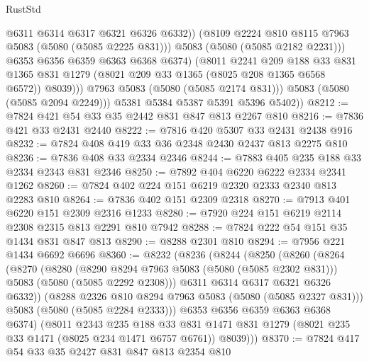 \begin{lexlean}{RustStd}
\begin{coremodule}
                        @6311
                        @6314
                        @6317
                        @6321
                        @6326
                        @6332))
                    (@8109 @2224 @810 @8115 @7963 @5083 (@5080 (@5085 @2225 @831)))
                    @5083
                    (@5080 (@5085 @2182 @2231)))
                  @6353
                  @6356
                  @6359
                  @6363
                  @6368
                  @6374)
                (@8011
                  @2241
                  @209
                  @188
                  @33
                  @831
                  @1365
                  @831
                  @1279
                  (@8021 @209 @33 @1365 (@8025 @208 @1365 @6568 @6572))
                  @8039)))
            @7963
            @5083
            (@5080 (@5085 @2174 @831)))
          @5083
          (@5080 (@5085 @2094 @2249)))
        @5381
        @5384
        @5387
        @5391
        @5396
        @5402))
@8212 := @7824 @421 @54 @33 @35 @2442 @831 @847 @813 @2267 @810
@8216 := @7836 @421 @33 @2431 @2440
@8222 := @7816 @420 @5307 @33 @2431 @2438 @916
@8232 := @7824 @408 @419 @33 @36 @2348 @2430 @2437 @813 @2275 @810
@8236 := @7836 @408 @33 @2334 @2346
@8244 := @7883 @405 @235 @188 @33 @2334 @2343 @831 @2346
@8250 := @7892 @404 @6220 @6222 @2334 @2341 @1262
@8260 := @7824 @402 @224 @151 @6219 @2320 @2333 @2340 @813 @2283 @810
@8264 := @7836 @402 @151 @2309 @2318
@8270 := @7913 @401 @6220 @151 @2309 @2316 @1233
@8280 := @7920 @224 @151 @6219 @2114 @2308 @2315 @813 @2291 @810 @7942
@8288 := @7824 @222 @54 @151 @35 @1434 @831 @847 @813
@8290 := @8288 @2301 @810
@8294 := @7956 @221 @1434 @6692 @6696
@8360 := @8232
    (@8236
      (@8244
        (@8250
          (@8260
            (@8264
              (@8270
                (@8280
                  (@8290 @8294 @7963 @5083 (@5080 (@5085 @2302 @831)))
                  @5083
                  (@5080 (@5085 @2292 @2308)))
                @6311
                @6314
                @6317
                @6321
                @6326
                @6332))
            (@8288 @2326 @810 @8294 @7963 @5083 (@5080 (@5085 @2327 @831)))
            @5083
            (@5080 (@5085 @2284 @2333)))
          @6353
          @6356
          @6359
          @6363
          @6368
          @6374)
        (@8011
          @2343
          @235
          @188
          @33
          @831
          @1471
          @831
          @1279
          (@8021 @235 @33 @1471 (@8025 @234 @1471 @6757 @6761))
          @8039)))
@8370 := @7824 @417 @54 @33 @35 @2427 @831 @847 @813 @2354 @810

\end{coremodule}
\end{lexlean}
